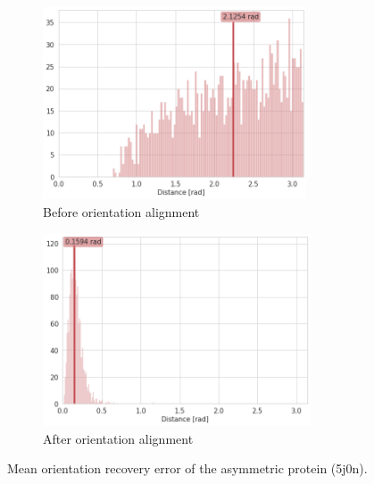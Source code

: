 \begin{figure}
    \centering
    \begin{subfigure}[b]{0.45\textwidth}
        \includegraphics[height=5.7cm]{images/5j0n_noise0_angle_alignment_before.png}
        \caption{Before orientation alignment}
    \end{subfigure}
    \hfill
    \begin{subfigure}[b]{0.5\textwidth}
    \centering
        \includegraphics[height=5.7cm]{images/5j0n_noise0_angle_alignment_after.png}
        \caption{After orientation alignment}
    \end{subfigure}
    \caption{
        Mean orientation recovery error of the asymmetric protein (5j0n).
}
    \label{fig:angle-alignment-5j0n-noise0}
\end{figure}

